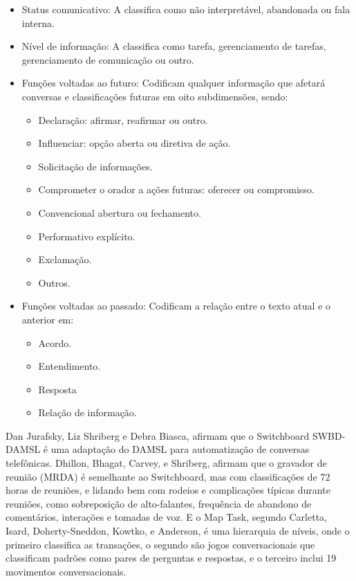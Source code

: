 \documentclass[
	12pt,				%
	oneside,
	a4paper,			%
	english,			%
	french,				%
	spanish,			%
	brazil				%
	]{abntex2}
\begin{document}
\begin{itemize}
	\item 
	Status comunicativo: A classifica como não interpretável, abandonada ou fala interna.
	\item 
	Nível de informação: A classifica como tarefa, gerenciamento de tarefas, gerenciamento de comunicação ou outro.
	\item 
	Funções voltadas ao futuro: Codificam qualquer informação que afetará conversas e classificações futuras em oito subdimensões, sendo:
	\begin{itemize}
		\item Declaração: afirmar, reafirmar ou outro.
		\item Influenciar: opção aberta ou diretiva de ação.
		\item Solicitação de informações.
		\item Comprometer o orador a ações futuras: oferecer ou compromisso.
		\item Convencional abertura ou fechamento.
		\item Performativo explícito.
		\item Exclamação.
		\item Outros.
	\end{itemize}
	\item Funções voltadas ao passado: Codificam a relação entre o texto atual e o anterior em:
	\begin{itemize}
		\item Acordo.
		\item Entendimento.
		\item Resposta
		\item Relação de informação.
	\end{itemize}

\end{itemize}

Dan Jurafsky, Liz Shriberg e Debra Biasca, afirmam que o Switchboard SWBD-DAMSL é uma adaptação do DAMSL para automatização de conversas telefônicas. Dhillon, Bhagat, Carvey, e Shriberg, afirmam que o gravador de reunião (MRDA) é semelhante ao Switchboard, mas com classificações de 72 horas de reuniões, e lidando bem com rodeios e complicações típicas durante reuniões, como sobreposição de alto-falantes, frequência de abandono de comentários, interações e tomadas de voz. E o Map Task, segundo Carletta, Isard, Doherty-Sneddon, Kowtko, e Anderson, é uma hierarquia de níveis, onde o primeiro classifica as transações, o segundo são jogos conversacionais que classificam padrões como pares de perguntas e respostas, e o terceiro inclui 19 movimentos conversacionais.
\end{document}
